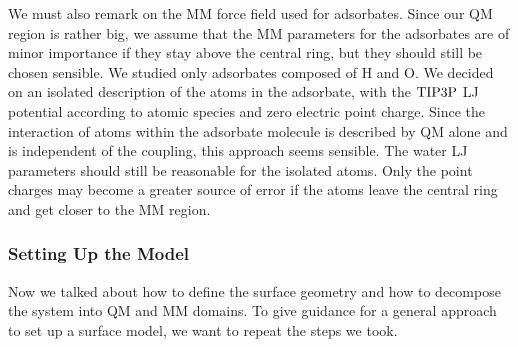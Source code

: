 \documentclass[8.5pt,twoside,twocolumn]{article}
\theoremstyle{standard}
\begin{document}
We must also remark on the MM force field used for adsorbates. Since our QM
region is rather big, we assume that the MM parameters for the adsorbates are
of minor importance if they stay above the central ring, but they should still
be chosen sensible. We studied only adsorbates composed of H and O. We decided on
an isolated description of the atoms in the adsorbate, with the $\text{TIP3P}$ LJ
potential according to atomic species and zero electric point charge. Since the
interaction of atoms within the adsorbate molecule is described by QM alone and
is independent of the coupling, this approach seems sensible. The water LJ
parameters should still be reasonable for the isolated atoms.
Only the point charges may become a greater source of error if the atoms
leave the central ring and get closer to the MM region.

\subsubsection{Setting Up the Model}

Now we talked about how to define the surface geometry and how to decompose
the system into QM and MM domains. To give guidance for a general approach to
set up a surface model, we want to repeat the steps we took.
\end{document}
